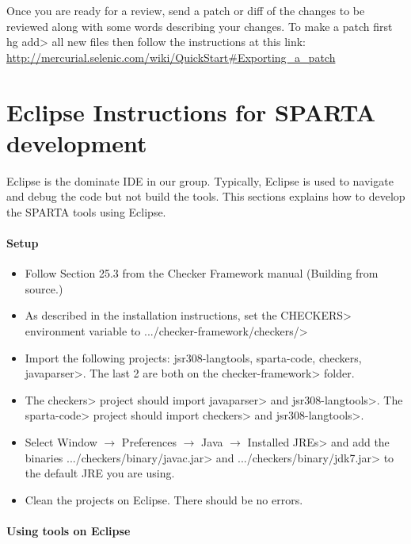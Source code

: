 Once you are ready for a review, send a patch or diff of the changes to be reviewed along with some words describing your changes.  To make a patch first \<hg add> all new files then follow the instructions at this link: 
\url{http://mercurial.selenic.com/wiki/QuickStart#Exporting_a_patch}

\section{Eclipse Instructions for SPARTA development\label{eclipse-instructions}}

Eclipse is the dominate IDE in our group.  Typically, Eclipse is used to navigate and debug the code but not build the tools.  This sections explains how to develop the 
SPARTA tools using Eclipse.  

\paragraph{Setup}


\begin{itemize}
\item Follow Section 25.3 from the Checker Framework manual 
(Building from source.)
\item As described in the installation instructions, set the \<CHECKERS>
environment variable to \<.../checker-framework/checkers/>
\item Import the following projects: \<jsr308-langtools,
sparta-code, checkers, javaparser>. The last 2 are both on the
\<checker-framework> folder.
\item The \<checkers> project should import \<javaparser> and \<jsr308-langtools>. 
The \<sparta-code> project should import \<checkers> and \<jsr308-langtools>.  
\item Select  \<Window $\rightarrow$ Preferences $\rightarrow$ Java 
$\rightarrow$ Installed JREs> and add the binaries \<.../checkers/binary/javac.jar> 
and \<.../checkers/binary/jdk7.jar> to the default JRE you are using.
\item Clean the projects on Eclipse. There should be no errors. 
\end{itemize}

\paragraph{Using tools on Eclipse}

